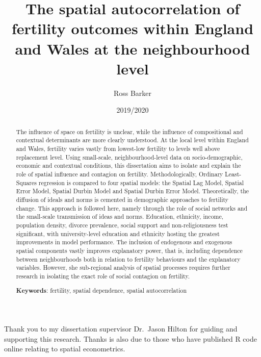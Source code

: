 \documentclass[12pt,twoside]{reedthesis}
\title{The spatial autocorrelation of fertility outcomes within England and Wales at the neighbourhood level}
\author{Ross Barker}
\date{2019/2020}
\begin{document}
  \maketitle

\frontmatter %
\pagestyle{empty} %
  \begin{acknowledgements}
    Thank you to my dissertation supervisor Dr.~Jason Hilton for guiding and supporting this research. Thanks is also due to those who have published R code online relating to spatial econometrics.
  \end{acknowledgements}

  \hypersetup{linkcolor=black}
  \setcounter{tocdepth}{2}
  \tableofcontents

  \listoftables

  \listoffigures
  \begin{abstract}
    The influence of space on fertility is unclear, while the influence of compositional and contextual determinants are more clearly understood. At the local level within England and Wales, fertility varies vastly from lowest-low fertility to levels well above replacement level. Using small-scale, neighbourhood-level data on socio-demographic, economic and contextual conditions, this dissertation aims to isolate and explain the role of spatial influence and contagion on fertility. Methodologically, Ordinary Least-Squares regression is compared to four spatial models: the Spatial Lag Model, Spatial Error Model, Spatial Durbin Model and Spatial Durbin Error Model. Theoretically, the diffusion of ideals and norms is cemented in demographic approaches to fertility change. This approach is followed here, namely through the role of social networks and the small-scale transmission of ideas and norms. Education, ethnicity, income, population density, divorce prevalence, social support and non-religiousness test significant, with university-level education and ethnicity hosting the greatest improvements in model performance. The inclusion of endogenous and exogenous spatial components vastly improves explanatory power, that is, including dependence between neighbourhoods both in relation to fertility behaviours and the explanatory variables. However, she sub-regional analysis of spatial processes requires further research in isolating the exact role of social contagion on fertility.
    
    \par
    
    \textbf{Keywords}: fertility, spatial dependence, spatial autocorrelation
  \end{abstract}
\end{document}
